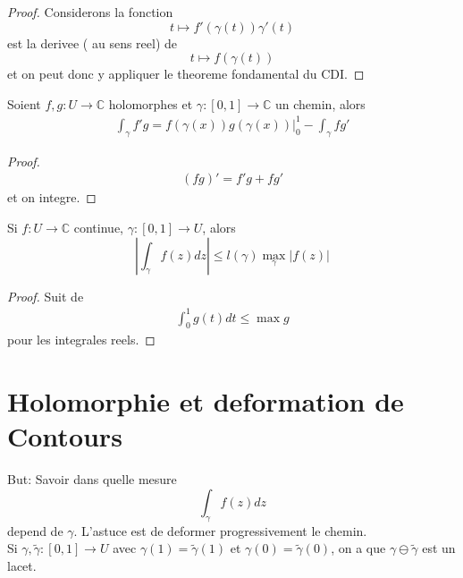 \documentclass[../main.tex]{subfiles}
\begin{document}
\begin{proof}
Considerons la fonction
\[ 
	t \mapsto f'( \gamma( t) ) \gamma'( t) 
\]
est la derivee ( au sens reel) de
\[ 
	t \mapsto f( \gamma( t) ) 
\]
et on peut donc y appliquer le theoreme fondamental du CDI.
\end{proof}
\begin{propo}
Soient $f,g: U \to \mathbb{C}$ holomorphes et $\gamma: [ 0,1] \to \mathbb{C}$ un chemin, alors
\begin{align*}
	\int_{ \gamma }^{  }f' g = f( \gamma( x) )g( \gamma( x) ) \big\vert_{0} ^{1} - \int_{ \gamma }^{  }fg'
\end{align*}

\end{propo}
\begin{proof}
\begin{align*}
	( fg) '= f'g + fg'
\end{align*}
et on integre.
\end{proof}
\begin{propo}
Si $f: U \to \mathbb{C}$ continue, $\gamma: [ 0,1] \to U$, alors
\[ 
	| \int_{\gamma }^{  } f( z) dz| \leq l( \gamma) \max_\gamma |f( z)|
\]

\end{propo}
\begin{proof}
Suit de
\begin{align*}
	\int_{ 0 }^{ 1 }g( t) dt \leq  \max g
\end{align*}
pour les integrales reels.
\end{proof}
\section{Holomorphie et deformation de Contours}
But: Savoir dans quelle mesure 
\[ 
	\int_{\gamma} f( z) dz
\]
depend de $\gamma$. L'astuce est de deformer progressivement le chemin.\\
Si $\gamma,\tilde\gamma: [ 0,1] \to U$ avec $\gamma( 1) = \tilde\gamma( 1) $ et $\gamma( 0) =\tilde\gamma ( 0) $, on a que $\gamma\ominus \tilde\gamma$ est un lacet.
\end{document}
